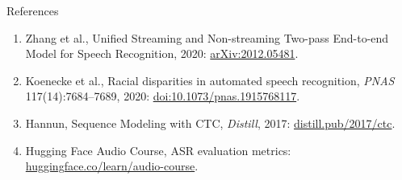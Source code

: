 \begin{frame}[allowframebreaks]{References}
\begin{enumerate}
    \item Zhang et al., Unified Streaming and Non-streaming Two-pass End-to-end Model for Speech Recognition, 2020: \href{https://arxiv.org/abs/2012.05481}{arXiv:2012.05481}.
    \item Koenecke et al., Racial disparities in automated speech recognition, \textit{PNAS} 117(14):7684--7689, 2020: \href{https://doi.org/10.1073/pnas.1915768117}{doi:10.1073/pnas.1915768117}.
    \item Hannun, Sequence Modeling with CTC, \textit{Distill}, 2017: \href{https://distill.pub/2017/ctc/}{distill.pub/2017/ctc}.
    \item Hugging Face Audio Course, ASR evaluation metrics: \href{https://huggingface.co/learn/audio-course/chapter5/evaluation}{huggingface.co/learn/audio-course}.
  \end{enumerate}
\end{frame}
